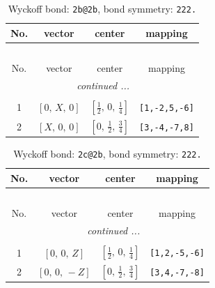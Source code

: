 \documentclass[fleqn,8pt]{jsarticle}
\begin{document}
\renewcommand{\arraystretch}{1.2}
\begin{longtable}{cccc}
\caption{Wyckoff bond: {\tt 2b@2b}, bond symmetry: {\tt 222.}}
 \\
 \hline \hline
No. & vector & center & mapping \\ \hline \endfirsthead

\multicolumn{3}{l}{\tablename\ \thetable{}} \\
 \hline \hline
No. & vector & center & mapping \\ \hline \endhead

 \hline \hline
\multicolumn{3}{r}{\footnotesize\it continued ...} \\ \endfoot

 \hline \hline
\multicolumn{3}{r}{} \\ \endlastfoot

1 & $\left[ 0,\, X,\, 0 \right]$ & $\left[ \frac{1}{2},\, 0,\, \frac{1}{4} \right]$ & {\tt [1,-2,5,-6]} \\ \hline
2 & $\left[ X,\, 0,\, 0 \right]$ & $\left[ 0,\, \frac{1}{2},\, \frac{3}{4} \right]$ & {\tt [3,-4,-7,8]} \\
\end{longtable}
\renewcommand{\arraystretch}{1.2}
\begin{longtable}{cccc}
\caption{Wyckoff bond: {\tt 2c@2b}, bond symmetry: {\tt 222.}}
 \\
 \hline \hline
No. & vector & center & mapping \\ \hline \endfirsthead

\multicolumn{3}{l}{\tablename\ \thetable{}} \\
 \hline \hline
No. & vector & center & mapping \\ \hline \endhead

 \hline \hline
\multicolumn{3}{r}{\footnotesize\it continued ...} \\ \endfoot

 \hline \hline
\multicolumn{3}{r}{} \\ \endlastfoot

1 & $\left[ 0,\, 0,\, Z \right]$ & $\left[ \frac{1}{2},\, 0,\, \frac{1}{4} \right]$ & {\tt [1,2,-5,-6]} \\ \hline
2 & $\left[ 0,\, 0,\, - Z \right]$ & $\left[ 0,\, \frac{1}{2},\, \frac{3}{4} \right]$ & {\tt [3,4,-7,-8]} \\
\end{longtable}
\renewcommand{\arraystretch}{1.2}
\end{document}
